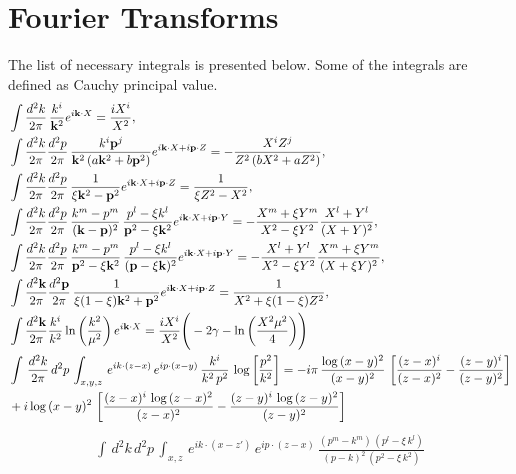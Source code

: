 \documentclass[10pt]{article}
\def\v#1{\mathbf{#1}}
\numberwithin{equation}{section}
\begin{document}
  \section{Fourier Transforms}
  The list of  necessary  integrals is presented below. Some of the integrals are defined as Cauchy principal value. 
  \begin{align}
    \label{i1} & \int\frac{d^{2}{k}}{2\pi}\,\frac{{k}^{i}}{\v{k}^{2}}e^{i\v{k}\cdot X}=\frac{iX^{i}}{X^{2}},  \\ 
    \label{i2} & \int\frac{d^{2}{k}}{2\pi}\frac{d^{2}{p}}{2\pi}\,\frac{{k}^{i}\mathbf{p}^{j}}{\mathbf{k}^{2}\left(a\mathbf{k}^{2}+b\mathbf{p}^{2}\right)}e^{i\mathbf{k}\cdot X+i\mathbf{p}\cdot Z}=-\frac{X^{i}Z^{j}}{Z^{2}\left(bX^{2}+aZ^{2}\right)},\\ 
  \label{i3} & \int\frac{d^{2}{k}}{2\pi}\frac{d^{2}{p}}{2\pi}\,\frac{1}{\xi \mathbf{k}^{2}- \mathbf{p}^{2}}e^{i\mathbf{k}\cdot X+i\mathbf{p}\cdot Z}=\frac{1}{\xi Z^2 -X^{2}}, \\
  \label{i4} & \int\frac{d^{2}{k}}{2\pi} \frac{d^{2}{p}}{2\pi}\,\frac{k^m - p^m }{(\v{k}-\v{p})^2} \,\frac{p^l - \xi k^l }{ \v{p}^2 -\xi \v{k}^2 }   e^{i\mathbf{k}\cdot X+i\mathbf{p}\cdot Y}
  =- \frac{X^m + \xi Y^m}{ X^2 - \xi Y^{2}}  \frac{X^l+Y^l} {(X+Y)^2},\\
  \label{i5} & \int\frac{d^{2}{k}}{2\pi} \frac{d^{2}{p}}{2\pi}\,\frac{k^m - p^m }{  \v{p}^2 -\xi \v{k}^2 } \,\frac{p^l - \xi k^l }{  (\v{p} - \xi \v{k})^2  }   e^{i\mathbf{k}\cdot X+i\mathbf{p}\cdot Y}
  =- \frac{X^l + Y^l}{ X^2 - \xi Y^{2}}  \frac{X^m+\xi Y^m} {(X+\xi Y)^2},\\
  \label{i7} & \int\frac{d^{2}\mathbf{k}}{2\pi}\frac{d^{2}\mathbf{p}}{2\pi}\,\frac{1}{\xi(1-\xi)\mathbf{k}^{2}+\mathbf{p}^{2}}e^{i\mathbf{k}\cdot X+i\mathbf{p}\cdot Z}=\frac{1}{X^{2}+\xi(1-\xi)Z^{2}}, \\ 
  \label{i8} & \int\frac{d^{2}\mathbf{k}}{2\pi}\frac{k^{i}}{k^{2}}\ln\bigg(\frac{k^{2}}{\mu^{2}}\bigg)\,e^{i\mathbf{k}\cdot X}= \frac{iX^{i}}{X^{2}}\Bigg(-2\gamma -\ln\bigg(\frac{X^{2}\mu^{2}}{4}\bigg)\Bigg) \\ 
  \label{i9} &  \int\, \frac{d^{2}k}{2\pi}\, d^{2}p\, \int_{x,y,z}\, e^{ik\cdot (z-x)}\, e^{ip\cdot (x-y)}\, \frac{k^{i}}{k^{2}\,p^{2}}\, \log{\left[\frac{p^{2}}{k^{2}}\right]}  = -i\pi\, \frac{\log{(x-y)^{2}}}{(x-y)^{2}}\, \left[\frac{(z-x)^{i}}{(z-x)^{2}}-\frac{(z-y)^{i}}{(z-y)^{2}}\right]\notag \\ & + i\log{(x-y)^{2}}\, \left[\frac{(z-x)^{i}\,\log{(z-x)^{2}}}{(z-x)^{2}}-\frac{(z-y)^{i}\, \log{(z-y)^{2}}}{(z-y)^{2}}\right]
\end{align}
\begin{align}
    \int\, d^{2}k\, d^{2}p\, \int_{x,z}\, e^{ik\cdot (x-z')}\, e^{ip\cdot (z-x)}\, \frac{(p^{m}-k^{m})\, (p^{l}-\xi\,k^{l})}{(p-k)^{2}\,(p^{2}-\xi\,k^{2})}
\end{align}
\end{document}

